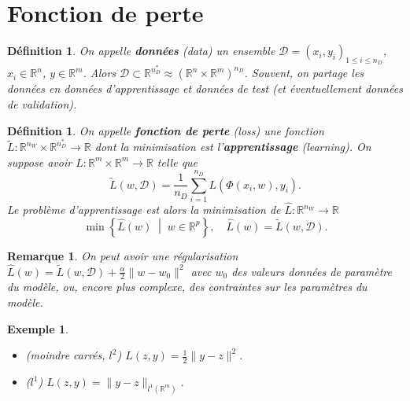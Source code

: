 \documentclass[11pt,a4paper]{article}
\newcommand{\nparammodel}{n_W}
\newcommand{\ndata}{n_D}
\newcommand{\ndataall}{n_D^*}
\newcommand{\R}{\mathbb R}
\newcommand{\norm}[1]{\|#1\|}
\newcommand{\SetDef}[2]{\left\{#1\;\middle|\;#2\right\}}
\newtheorem{remark}[theorem]{Remarque}
\newtheorem{definition}[theorem]{Définition}
\newtheorem{example}[theorem]{Exemple}
\begin{document}
\section{Fonction de perte}\label{sec:}
%
%
\begin{definition}\label{definition:}
On appelle \textbf{données} (\textit{data}) un ensemble $\mathcal D=(x_i,y_i)_{1\le i\le \ndata}$, $x_i\in\R^n$, $y\in \R^m$. 
Alors $\mathcal D\subset \R^{\ndataall} \approx \left(\R^n\times \R^m\right)^{\ndata}$. 
Souvent, on partage les données en données d'apprentissage et données de test (et éventuellement données de validation).
\end{definition}
%
%
\begin{definition}\label{definition:}
On appelle \textbf{fonction de perte} (\textit{loss}) une fonction $\widetilde{L}:\R^{\nparammodel}\times\R^{\ndataall}\to \R$ dont la minimisation est l'\textbf{apprentissage} (\textit{learning}). On suppose avoir $L:\R^m\times \R^m\to \R$ telle que
%
\begin{equation}\label{equation:}
\widetilde{L}(w,\mathcal D) = \frac{1}{\ndata}\sum_{i=1}^{\ndata} L(\Phi(x_i,w),y_i).
\end{equation}
%
Le problème d'apprentissage est alors la minimisation de $\widehat{L}:\R^{\nparammodel}\to\R$
%
\begin{equation}\label{equation:}
\min\SetDef{\widehat{L}(w)}{w\in \R^p},\quad \widehat{L}(w) = \widetilde{L}(w,\mathcal D).
\end{equation}
%
\end{definition}
%
%
\begin{remark}\label{remark:}
On peut avoir une régularisation $\widehat{L}(w) = \widetilde{L}(w,\mathcal D) + \frac{\alpha}{2}\norm{w-w_0}^2$ avec $w_0$ des valeurs données de paramètre du modèle, ou, encore plus complexe, des contraintes sur les paramètres du modèle.
\end{remark}
%
%
\begin{example}\label{example:}
\begin{itemize}
\item (moindre carrés, $l^2$) $L(z,y)= \frac12\norm{y-z}^2$.
\item ($l^1$) $L(z,y)= \norm{y-z}_{l^1(\R^m)}$.
\end{itemize}
\end{example}
\end{document}
